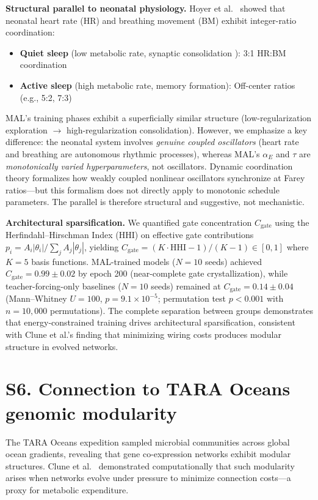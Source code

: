 \documentclass[aps,pre,reprint,superscriptaddress]{revtex4-2}
\begin{document}
\textbf{Structural parallel to neonatal physiology.} Hoyer et al.\ \cite{Hoyer2001} showed that neonatal heart rate (HR) and breathing movement (BM) exhibit integer-ratio coordination:
\begin{itemize}
\item \textbf{Quiet sleep} (low metabolic rate, synaptic consolidation \cite{Tononi2020}): 3:1 HR:BM coordination
\item \textbf{Active sleep} (high metabolic rate, memory formation): Off-center ratios (e.g., 5:2, 7:3)
\end{itemize}

MAL's training phases exhibit a superficially similar structure (low-regularization exploration $\to$ high-regularization consolidation). However, we emphasize a key difference: the neonatal system involves \textit{genuine coupled oscillators} (heart rate and breathing are autonomous rhythmic processes), whereas MAL's $\alpha_E$ and $\tau$ are \textit{monotonically varied hyperparameters}, not oscillators. Dynamic coordination theory \cite{Schoner1988} formalizes how weakly coupled nonlinear oscillators synchronize at Farey ratios---but this formalism does not directly apply to monotonic schedule parameters. The parallel is therefore structural and suggestive, not mechanistic.

\textbf{Architectural sparsification.} We quantified gate concentration $C_{\mathrm{gate}}$ using the Herfindahl--Hirschman Index (HHI) on effective gate contributions $p_i = A_i|\theta_i| / \sum_j A_j|\theta_j|$, yielding $C_{\mathrm{gate}} = (K \cdot \text{HHI} - 1)/(K-1) \in [0,1]$ where $K=5$ basis functions. MAL-trained models ($N=10$ seeds) achieved $C_{\mathrm{gate}} = 0.99 \pm 0.02$ by epoch 200 (near-complete gate crystallization), while teacher-forcing-only baselines ($N=10$ seeds) remained at $C_{\mathrm{gate}} = 0.14 \pm 0.04$ (Mann--Whitney $U = 100$, $p = 9.1 \times 10^{-5}$; permutation test $p < 0.001$ with $n = 10{,}000$ permutations). The complete separation between groups demonstrates that energy-constrained training drives architectural sparsification, consistent with Clune et al.'s \cite{Clune2013} finding that minimizing wiring costs produces modular structure in evolved networks.

\section{S6. Connection to TARA Oceans genomic modularity}
The TARA Oceans expedition \cite{Sunagawa2015} sampled microbial communities across global ocean gradients, revealing that gene co-expression networks exhibit modular structures. Clune et al.\ \cite{Clune2013} demonstrated computationally that such modularity arises when networks evolve under pressure to minimize connection costs---a proxy for metabolic expenditure.
\end{document}

